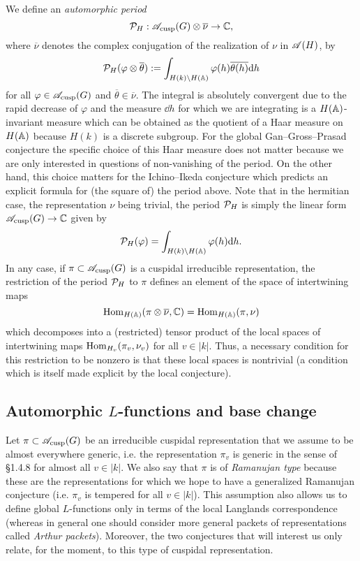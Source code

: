 We define an \emph{automorphic period}
\[
    \mathcal{P}_H: \mathscr{A}_{\mathrm{cusp}}(G) \otimes \overline{\nu} \to \mathbb{C},
\]
where $\overline{\nu}$ denotes the complex conjugation of the realization of $\nu$ in $\mathscr{A}(H)$, by
\[
    \mathcal{P}_H(\varphi \otimes \overline{\theta}) := \int_{H(k) \backslash H(\mathbb{A})} \varphi(h) \overline{\theta(h)} \mathrm{d} h
\]
for all $\varphi \in \mathscr{A}_{\mathrm{cusp}}(G)$ and $\overline{\theta} \in \overline{\nu}$.
The integral is absolutely convergent due to the rapid decrease of $\varphi$ and the measure $\dd h$ for which we are integrating is a $H(\mathbb{A})$-invariant measure which can be obtained as the quotient of a Haar measure on $H(\mathbb{A})$ because $H(k)$ is a discrete subgroup.
For the global Gan--Gross--Prasad conjecture the specific choice of this Haar measure does not matter because we are only interested in questions of non-vanishing of the period.
On the other hand, this choice matters for the Ichino--Ikeda conjecture which predicts an explicit formula for (the square of) the period above.
Note that in the hermitian case, the representation $\nu$ being trivial, the period $\mathcal{P}_H$ is simply the linear form $\mathscr{A}_{\mathrm{cusp}}(G) \to \mathbb{C}$ given by
\[
    \mathcal{P}_H(\varphi) = \int_{H(k) \backslash H(\mathbb{A})} \varphi(h) \mathrm{d} h.
\]
In any case, if $\pi \subset \mathscr{A}_{\mathrm{cusp}}(G)$ is a cuspidal irreducible representation, the restriction of the period $\mathcal{P}_H$ to $\pi$ defines an element of the space of intertwining maps
\[
    \mathrm{Hom}_{H(\mathbb{A})}(\pi \otimes \overline{\nu}, \mathbb{C}) = \mathrm{Hom}_{H(\mathbb{A})}(\pi, \nu)
\]
which decomposes into a (restricted) tensor product of the local spaces of intertwining maps $\mathrm{Hom}_{H_v}(\pi_v, \nu_v)$ for all $v \in |k|$.
Thus, a necessary condition for this restriction to be nonzero is that these local spaces is nontrivial (a condition which is itself made explicit by the local conjecture).


\subsection{Automorphic $L$-functions and base change}

Let $\pi \subset \mathscr{A}_{\mathrm{cusp}}(G)$ be an irreducible cuspidal representation that we assume to be almost everywhere generic, i.e. the representation $\pi_v$ is generic in the sense of \S 1.4.8 for almost all $v \in |k|$.
We also say that $\pi$ is of \emph{Ramanujan type} because these are the representations for which we hope to have a generalized Ramanujan conjecture (i.e. $\pi_v$ is tempered for all $v \in |k|$).
This assumption also allows us to define global $L$-functions only in terms of the local Langlands correspondence (whereas in general one should consider more general packets of representations called \emph{Arthur packets}).
Moreover, the two conjectures that will interest us only relate, for the moment, to this type of cuspidal representation.

